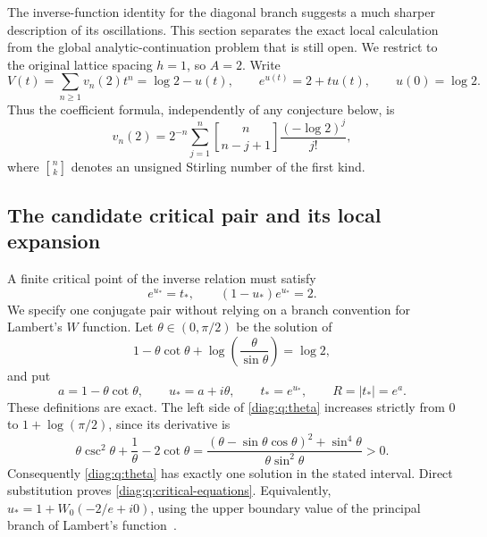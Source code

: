 \documentclass[11pt,a4paper]{article}
\theoremstyle{definition}
\theoremstyle{remark}
\newcommand{\stirling}[2]{\genfrac{[}{]}{0pt}{}{#1}{#2}}
\numberwithin{equation}{section}
\begin{document}
The inverse-function identity for the diagonal branch suggests a much
sharper description of its oscillations.  This section separates the exact
local calculation from the global analytic-continuation problem that is
still open.  We restrict to the original lattice spacing $h=1$, so $A=2$.
Write
\begin{equation}\label{diag:q:inverse}
 V(t)=\sum_{n\geq1}v_n(2)t^n=\log2-u(t),\qquad
 e^{u(t)}=2+tu(t),\qquad u(0)=\log2.
\end{equation}
Thus the coefficient formula, independently of any conjecture below, is
\begin{equation}\label{diag:q:exact-coefficients}
 v_n(2)=2^{-n}\sum_{j=1}^{n}
    \stirling{n}{n-j+1}\frac{(-\log2)^j}{j!},
\end{equation}
where $\stirling{n}{k}$ denotes an unsigned Stirling number of the first kind.

\subsection{The candidate critical pair and its local expansion}
\label{diag:q:critical-subsection}

A finite critical point of the inverse relation must satisfy
\begin{equation}\label{diag:q:critical-equations}
 e^{u_*}=t_*,\qquad (1-u_*)e^{u_*}=2.
\end{equation}
We specify one conjugate pair without relying on a branch convention for
Lambert's $W$ function.  Let $\theta\in(0,\pi/2)$ be the solution of
\begin{equation}\label{diag:q:theta}
 1-\theta\cot\theta+
       \log\!\left(\frac{\theta}{\sin\theta}\right)=\log2,
\end{equation}
and put
\begin{equation}\label{diag:q:parameters}
 a=1-\theta\cot\theta,\qquad u_*=a+i\theta,\qquad
 t_*=e^{u_*},\qquad R=|t_*|=e^a.
\end{equation}
These definitions are exact.  The left side of \eqref{diag:q:theta}
increases strictly from $0$ to $1+\log(\pi/2)$, since its derivative is
\[
 \theta\csc^2\theta+\frac1\theta-2\cot\theta
 =\frac{(\theta-\sin\theta\cos\theta)^2+\sin^4\theta}
         {\theta\sin^2\theta}>0.
\]
Consequently \eqref{diag:q:theta} has exactly one solution in the stated
interval.  Direct substitution proves \eqref{diag:q:critical-equations}.
Equivalently, $u_*=1+W_0(-2/e+i0)$, using the upper boundary value of the
principal branch of Lambert's function~\cite[\S4.13]{DLMF}.
\end{document}
